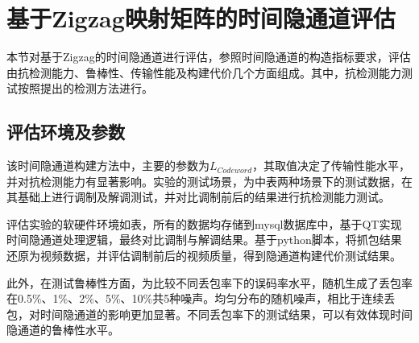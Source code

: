 \section{基于Zigzag映射矩阵的时间隐通道评估}
\label{chap:zigzag:results}
本节对基于Zigzag的时间隐通道进行评估，参照时间隐通道的构造指标要求，评估由抗检测能力、鲁棒性、传输性能及构建代价几个方面组成。其中，抗检测能力测试按照提出的检测方法进行。

\subsection{评估环境及参数}
\label{chap:zigzag:results:environment}
该时间隐通道构建方法中，主要的参数为$L_{Codeword}$，其取值决定了传输性能水平，并对抗检测能力有显著影响。实验的测试场景，为中表两种场景下的测试数据，在其基础上进行调制及解调测试，并对比调制前后的结果进行抗检测能力测试。


评估实验的软硬件环境如表，所有的数据均存储到mysql数据库中，基于QT实现时间隐通道处理逻辑，最终对比调制与解调结果。基于python脚本，将抓包结果还原为视频数据，并评估调制前后的视频质量，得到隐通道构建代价测试结果。

此外，在测试鲁棒性方面，为比较不同丢包率下的误码率水平，随机生成了丢包率在0.5\%、1\%、2\%、5\%、10\%共5种噪声。均匀分布的随机噪声，相比于连续丢包，对时间隐通道的影响更加显著。不同丢包率下的测试结果，可以有效体现时间隐通道的鲁棒性水平。

